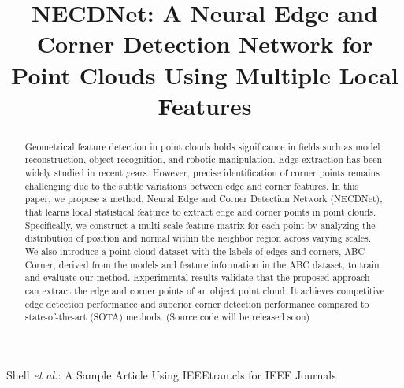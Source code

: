 \documentclass[lettersize,journal]{IEEEtran}
\begin{document}
\title{NECDNet: A Neural Edge and Corner Detection Network for Point Clouds Using Multiple Local Features}



%
{Shell \MakeLowercase{\textit{et al.}}: A Sample Article Using IEEEtran.cls for IEEE Journals}


\maketitle

\begin{abstract}
Geometrical feature detection in point clouds holds significance in fields such as model reconstruction, object recognition, and robotic manipulation. Edge extraction has been widely studied in recent years. However, precise identification of corner points remains challenging due to the subtle variations between edge and corner features. In this paper, we propose a method, Neural Edge and Corner Detection Network (NECDNet), that learns local statistical features to extract edge and corner points in point clouds. Specifically, we construct a multi-scale feature matrix for each point by analyzing the distribution of position and normal within the neighbor region across varying scales. We also introduce a point cloud dataset with the labels of edges and corners, ABC-Corner, derived from the models and feature information in the ABC dataset, to train and evaluate our method. Experimental results validate that the proposed approach can extract the edge and corner points of an object point cloud. It achieves competitive edge detection performance and superior corner detection performance compared to state-of-the-art (SOTA) methods. (Source code will be released soon)
\end{abstract}
\end{document}
